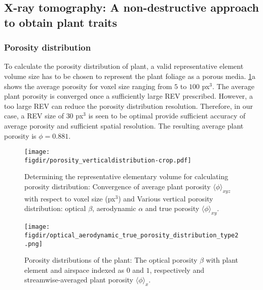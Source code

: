 \subsection{X-ray tomography: A non-destructive approach to obtain plant traits}

\subsubsection*{Porosity distribution} 

To calculate the porosity distribution of plant, a valid representative element volume size has to be chosen to represent the plant foliage as a porous media. \cref{fig:porositydistribution}a shows the average porosity for voxel size ranging from $5$ to $100$ px$^3$. The average plant porosity is converged once a sufficiently large REV prescribed. However, a too large REV can reduce the porosity distribution resolution. Therefore, in our case, a REV size of $30$ px$^3$ is seen to be optimal provide sufficient accuracy of average porosity and sufficient spatial resolution. The resulting average plant porosity is $\phi= 0.881$. 

	\begin{figure}[p]
		\centering
		\texttt{[image: \\figdir/porosity\_verticaldistribution-crop.pdf]}
		\caption{Determining the representative elementary volume for calculating porosity distribution:  Convergence of average plant porosity $\langle \phi \rangle_{xyz}$ with respect to voxel size (px$^3$) and  Various vertical porosity distribution: optical $\beta$, aerodynamic $\alpha$ and true porosity $\langle \phi \rangle_{xy}$.}
		\label{fig:porositydistribution}
	\end{figure}

	\begin{figure}[p]
		\centering
		\texttt{[image: \\figdir/optical\_aerodynamic\_true\_porosity\_distribution\_type2.png]}
		\caption{Porosity distributions of the plant:  The optical porosity $\beta$ with plant element and airspace indexed as $0$ and $1$, respectively and  streamwise-averaged plant porosity $\langle \phi \rangle_x$. }
		\label{fig:porosities}
	\end{figure}

